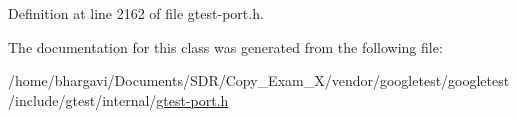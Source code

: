 Definition at line 2162 of file gtest-\/port.\+h.



The documentation for this class was generated from the following file\+:\begin{DoxyCompactItemize}
\item 
/home/bhargavi/\+Documents/\+S\+D\+R/\+Copy\+\_\+\+Exam\+\_\+X/vendor/googletest/googletest/include/gtest/internal/\hyperlink{gtest-port_8h}{gtest-\/port.\+h}\end{DoxyCompactItemize}
